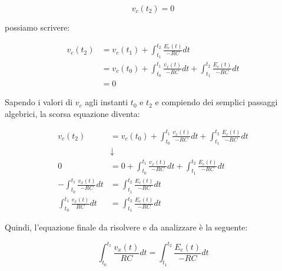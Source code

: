 {
    \Large 
    \begin{equation}
        v_c(t_2) = 0
    \end{equation}
}

possiamo scrivere: 

{
    \Large 
    \begin{equation}
        \begin{split}
            v_c(t_2) 
            &=
            v_c(t_1)
            + 
            \int_{t_1}^{t_2} \frac{E_c (t)}{-RC} dt
            \\ 
            &= 
            v_c(t_0) + \int_{t_0}^{t_1} \frac{v_x(t)}{-RC} dt + \int_{t_1}^{t_2} \frac{E_c (t)}{-RC} dt
            \\
            &= 
            0
        \end{split}
    \end{equation}
}

Sapendo i valori di $v_c$ agli instanti $t_0$ e $t_2$ e compiendo dei semplici passaggi algebrici, 
la scorsa equazione diventa:

{
    \Large 
    \begin{equation}
        \begin{split}
            v_c(t_2) 
            &=
            v_c(t_0) + \int_{t_0}^{t_1} \frac{v_x(t)}{-RC} dt + \int_{t_1}^{t_2} \frac{E_c (t)}{-RC} dt
            \\
            &\downarrow
            \\
            0
            &= 
            0 + \int_{t_0}^{t_1} \frac{v_x(t)}{-RC} dt + \int_{t_1}^{t_2} \frac{E_c (t)}{-RC} dt
            \\
            - \int_{t_0}^{t_1} \frac{v_x(t)}{-RC} dt 
            &=
            \int_{t_1}^{t_2} \frac{E_c (t)}{-RC} dt
            \\
            \int_{t_0}^{t_1} \frac{v_x(t)}{RC} dt 
            &=
            \int_{t_1}^{t_2} \frac{E_c (t)}{-RC} dt
        \end{split} 
    \end{equation}
}

Quindi, l'equazione finale da risolvere e da analizzare è la seguente: 

{
    \Large 
    \begin{equation}
        \int_{t_0}^{t_1} \frac{v_x(t)}{RC} dt 
        =
        \int_{t_1}^{t_2} \frac{E_c (t)}{-RC} dt
    \end{equation}
}

\newpage 

